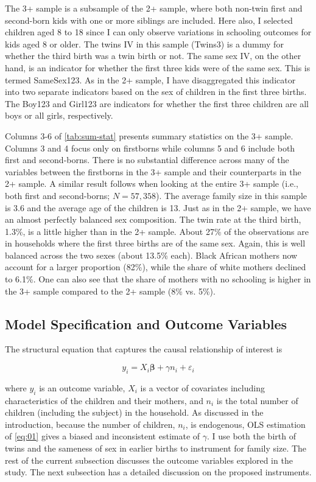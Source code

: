 The 3+ sample is a subsample of the 2+ sample, where both non-twin first and second-born kids with one or more siblings are included. Here also, I selected children aged 8 to 18 since I can only observe variations in schooling outcomes for kids aged 8 or older. The twins IV in this sample (Twins3) is a dummy for whether the third birth was a twin birth or not. The same sex IV, on the other hand, is an indicator for whether the first three kids were of the same sex. This is termed SameSex123. As in the 2+ sample, I have disaggregated this indicator into two separate indicators based on the sex of children in the first three births. The Boy123 and Girl123 are indicators for whether the first three children are all boys or all girls, respectively. 

Columns 3-6 of \autoref{tab:sum-stat} presents summary statistics on the 3+ sample. Columns 3 and 4 focus only on firstborns while columns 5 and 6 include both first and second-borns. There is no substantial difference across many of the variables between the firstborns in the 3+ sample and their counterparts in the 2+ sample. A similar result follows when looking at the entire 3+ sample (i.e., both first and second-borns; $ N = 57,358 $). The average family size in this sample is 3.6 and the average age of the children is 13. Just as in the 2+ sample, we have an almost perfectly balanced sex composition. The twin rate at the third birth, 1.3\%, is a little higher than in the 2+ sample. About 27\% of the observations are in households where the first three births are of the same sex. Again, this is well balanced across the two sexes (about 13.5\% each). Black African mothers now account for a larger proportion (82\%), while the share of white mothers declined to 6.1\%. One can also see that the share of mothers with no schooling is higher in the 3+ sample compared to the 2+ sample (8\% vs. 5\%).   
    

\subsection{Model Specification and Outcome Variables}
\label{section:outcomes}

The structural equation that captures the causal relationship of interest is

\begin{equation}\label{eq:01}
	y_{i} = X_{i}\boldsymbol{\beta} + \gamma n_{i} + \varepsilon_{i}
\end{equation}

where $ y_{i} $ is an outcome variable, $ X_{i} $ is a vector of covariates including characteristics of the children and their mothers, and $ n_{i} $ is the total number of children (including the subject) in the household. As discussed in the introduction, because the number of children, $ n_{i} $, is endogenous, OLS estimation of \eqref{eq:01} gives a biased and inconsistent estimate of $ \gamma $. I use both the birth of twins and the sameness of sex in earlier births to instrument for family size. The rest of the current subsection discusses the outcome variables explored in the study. The next subsection has a detailed discussion on the proposed instruments.  

